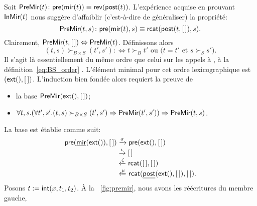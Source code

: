Soit \(\textsf{PreMir}({t}) \colon \textsf{pre}(\textsf{mir}(t)) \equiv
\textsf{rev}(\textsf{post}(t))\).
L'expérience acquise en prouvant \(\textsf{InMir}({t})\) nous suggère
d'affaiblir (c'est-à-dire de généraliser) la propriété:
\begin{equation*}
  \pred{PreMir}{t,s} \colon
  \fun{pre}(\fun{mir}(t),s) \equiv
  \fun{rcat}(\fun{post}(t,\el),s).
  \index{rcat@\fun{rcat/2}}
\end{equation*}
Clairement, \(\textsf{PreMir}({t,[\,]}) \Leftrightarrow
\textsf{PreMir}({t})\). Définissons alors
\begin{equation*}
  (t,s) \succ_{B \times S} (t',s') :\Leftrightarrow \text{\(t \succ_{B}
    t'\) ou (\(t = t'\) et \(s \succ_{S} s'\))}.
\end{equation*}
Il s'agit là essentiellement du même ordre que celui sur les appels à
, à la
définition~\eqref{eq:BS_order} . L'élément
minimal pour cet ordre lexicographique est
\((\textsf{ext}(),[\,])\). L'induction bien fondée alors requiert la
preuve de
\begin{itemize}

  \item la base \(\textsf{PreMir}({\textsf{ext}(),[\,]})\);

  \item \(\forall t,s. (\forall t',s'.(t,s) \succ_{B \times S} (t',s')
    \Rightarrow \textsf{PreMir}({t',s'})) \Rightarrow
    \textsf{PreMir}({t,s})\).

\end{itemize}
La base est établie comme suit:
\begin{align*}
  \textsf{pre}(\underline{\textsf{mir}}(\textsf{ext}()),[\,])
  &\xrightarrow{\smash{\sigma}} \textsf{pre}(\textsf{ext}(),[\,])\\
  &\xrightarrow{\smash{\iota}} [\,]\\
  &\xleftarrow{\smash{\zeta}} \textsf{rcat}([\,],[\,])\\
  &\xleftarrow{\smash{\mu}}
  \textsf{rcat}(\underline{\textsf{post}}(\textsf{ext}(),[\,]),[\,]).
\end{align*}
Posons \(t := \textsf{int}(x,t_1,t_2)\). À la \fig~\vref{fig:premir},
nous avons les réécritures du membre gauche,
